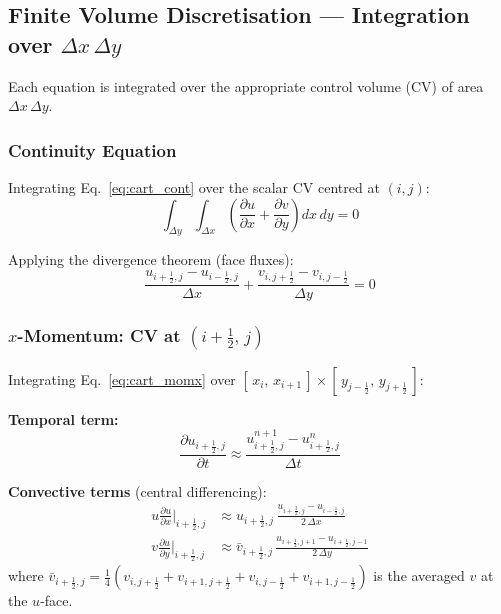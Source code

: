 \subsection{Finite Volume Discretisation --- Integration over $\Delta x\,\Delta y$}

Each equation is integrated over the appropriate control volume (CV) of area $\Delta x\,\Delta y$.

\subsubsection{Continuity Equation}

Integrating Eq.~\eqref{eq:cart_cont} over the scalar CV centred at $(i,j)$:
\begin{equation}
    \int_{\Delta y}\!\int_{\Delta x}
    \left(\frac{\partial u}{\partial x}+\frac{\partial v}{\partial y}\right)
    dx\,dy = 0
\end{equation}

Applying the divergence theorem (face fluxes):
\begin{equation}
    \frac{u_{i+\frac{1}{2},j} - u_{i-\frac{1}{2},j}}{\Delta x}
    + \frac{v_{i,j+\frac{1}{2}} - v_{i,j-\frac{1}{2}}}{\Delta y} = 0
    \label{eq:cart_disc_cont}
\end{equation}

\subsubsection{$x$-Momentum: CV at $(i+\tfrac{1}{2},\,j)$}

Integrating Eq.~\eqref{eq:cart_momx} over $[\,x_i,\,x_{i+1}\,]\times[\,y_{j-\frac{1}{2}},\,y_{j+\frac{1}{2}}\,]$:

\textbf{Temporal term:}
\begin{equation}
    \frac{\partial u_{i+\frac{1}{2},j}}{\partial t} \approx
    \frac{u_{i+\frac{1}{2},j}^{n+1} - u_{i+\frac{1}{2},j}^{n}}{\Delta t}
\end{equation}

\textbf{Convective terms} (central differencing):
\begin{align}
    u\frac{\partial u}{\partial x}\bigg|_{i+\frac{1}{2},j}
    &\approx u_{i+\frac{1}{2},j}\,
       \frac{u_{i+\frac{3}{2},j} - u_{i-\frac{1}{2},j}}{2\,\Delta x}
    \\[4pt]
    v\frac{\partial u}{\partial y}\bigg|_{i+\frac{1}{2},j}
    &\approx \bar{v}_{i+\frac{1}{2},j}\,
       \frac{u_{i+\frac{1}{2},j+1} - u_{i+\frac{1}{2},j-1}}{2\,\Delta y}
\end{align}
where $\bar{v}_{i+\frac{1}{2},j}
= \tfrac{1}{4}\!\left(v_{i,j+\frac{1}{2}}+v_{i+1,j+\frac{1}{2}}
                     +v_{i,j-\frac{1}{2}}+v_{i+1,j-\frac{1}{2}}\right)$
is the averaged $v$ at the $u$-face.

